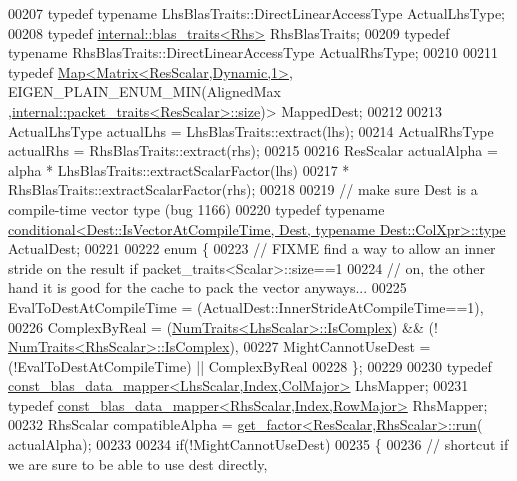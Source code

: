 \begin{DoxyCode}
00207     \textcolor{keyword}{typedef} \textcolor{keyword}{typename} LhsBlasTraits::DirectLinearAccessType ActualLhsType;
00208     \textcolor{keyword}{typedef} \hyperlink{struct_eigen_1_1internal_1_1blas__traits}{internal::blas\_traits<Rhs>} RhsBlasTraits;
00209     \textcolor{keyword}{typedef} \textcolor{keyword}{typename} RhsBlasTraits::DirectLinearAccessType ActualRhsType;
00210   
00211     \textcolor{keyword}{typedef} \hyperlink{group___core___module_class_eigen_1_1_map}{Map<Matrix<ResScalar,Dynamic,1>}, EIGEN\_PLAIN\_ENUM\_MIN(AlignedMax
      ,\hyperlink{struct_eigen_1_1internal_1_1packet__traits}{internal::packet\_traits<ResScalar>::size})> MappedDest;
00212 
00213     ActualLhsType actualLhs = LhsBlasTraits::extract(lhs);
00214     ActualRhsType actualRhs = RhsBlasTraits::extract(rhs);
00215 
00216     ResScalar actualAlpha = alpha * LhsBlasTraits::extractScalarFactor(lhs)
00217                                   * RhsBlasTraits::extractScalarFactor(rhs);
00218 
00219     \textcolor{comment}{// make sure Dest is a compile-time vector type (bug 1166)}
00220     \textcolor{keyword}{typedef} \textcolor{keyword}{typename} 
      \hyperlink{class_eigen_1_1internal_1_1_tensor_lazy_evaluator_writable}{conditional<Dest::IsVectorAtCompileTime, Dest, typename Dest::ColXpr>::type}
       ActualDest;
00221 
00222     \textcolor{keyword}{enum} \{
00223       \textcolor{comment}{// FIXME find a way to allow an inner stride on the result if packet\_traits<Scalar>::size==1}
00224       \textcolor{comment}{// on, the other hand it is good for the cache to pack the vector anyways...}
00225       EvalToDestAtCompileTime = (ActualDest::InnerStrideAtCompileTime==1),
00226       ComplexByReal = (\hyperlink{group___core___module_struct_eigen_1_1_num_traits}{NumTraits<LhsScalar>::IsComplex}) && (!
      \hyperlink{group___core___module_struct_eigen_1_1_num_traits}{NumTraits<RhsScalar>::IsComplex}),
00227       MightCannotUseDest = (!EvalToDestAtCompileTime) || ComplexByReal
00228     \};
00229 
00230     \textcolor{keyword}{typedef} \hyperlink{class_eigen_1_1internal_1_1const__blas__data__mapper}{const\_blas\_data\_mapper<LhsScalar,Index,ColMajor>}
       LhsMapper;
00231     \textcolor{keyword}{typedef} \hyperlink{class_eigen_1_1internal_1_1const__blas__data__mapper}{const\_blas\_data\_mapper<RhsScalar,Index,RowMajor>}
       RhsMapper;
00232     RhsScalar compatibleAlpha = \hyperlink{struct_eigen_1_1internal_1_1get__factor}{get\_factor<ResScalar,RhsScalar>::run}(
      actualAlpha);
00233 
00234     \textcolor{keywordflow}{if}(!MightCannotUseDest)
00235     \{
00236       \textcolor{comment}{// shortcut if we are sure to be able to use dest directly,}

\end{DoxyCode}
